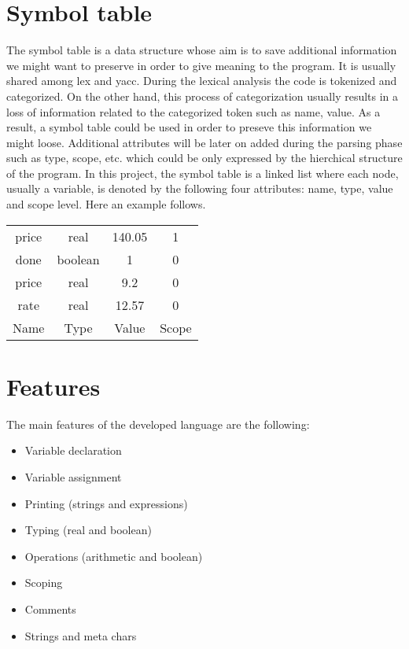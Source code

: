 \documentclass[12pt]{article}
\begin{document}
\section{Symbol table}
The symbol table is a data structure whose aim is to save additional information we might want to preserve in order to give meaning to the program. It is usually shared among lex and yacc. During the lexical analysis the code is tokenized and categorized. On the other hand, this process of categorization usually results in a loss of information related to the categorized token such as name, value. As a result, a symbol table could be used in order to preseve this information we might loose. Additional attributes will be later on added during the parsing phase such as type, scope, etc. which could be only expressed by the hierchical structure of the program. In this project, the symbol table is a linked list where each node, usually a variable, is denoted by the following four attributes: name, type, value and scope level. Here an example follows.
\vspace{0.3cm}
\begin{table}[h!]
\centering
\begin{tabular}{c|c|c|c}
price & real & 140.05 & 1 \\
done & boolean & 1 & 0 \\
price & real & 9.2 & 0 \\
rate & real & 12.57 & 0 \\
\hline
Name & Type & Value & Scope
\end{tabular}
\end{table}
\vspace{1.7cm}





\section{Features}
The main features of the developed language are the following:
\begin{itemize}
\item Variable declaration
\item Variable assignment
\item Printing (strings and expressions)
\item Typing (real and boolean)
\item Operations (arithmetic and boolean)
\item Scoping
\item Comments
\item Strings and meta chars
\end{itemize}
\end{document}
